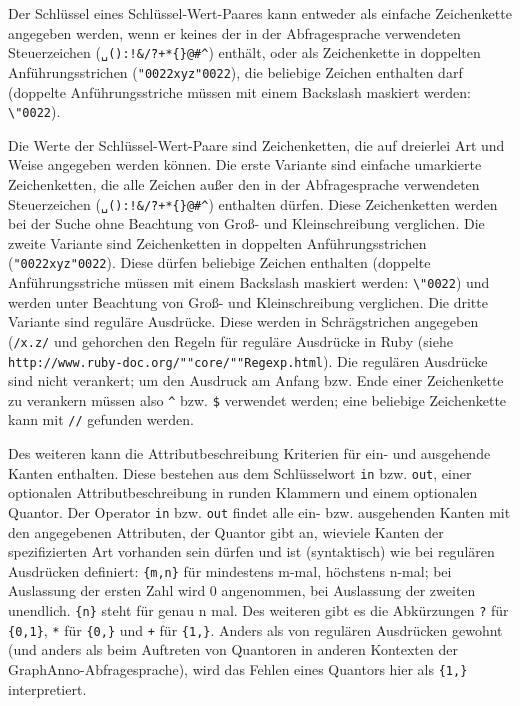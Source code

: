 \documentclass[12pt]{scrartcl}
\begin{document}
Der Schlüssel eines Schlüssel-Wert-Paares kann entweder als einfache Zeichenkette angegeben werden, wenn er keines der in der Abfragesprache verwendeten Steuerzeichen (\texttt{␣():!\&\"/?+*\{\}@\#\^{}}) enthält, oder als Zeichenkette in doppelten Anführungsstrichen (\texttt{\char"0022xyz\char"0022}), die beliebige Zeichen enthalten darf (doppelte Anführungsstriche müssen mit einem Backslash maskiert werden: \texttt{\textbackslash\char"0022}).

Die Werte der Schlüssel-Wert-Paare sind Zeichenketten, die auf dreierlei Art und Weise angegeben werden können. Die erste Variante sind einfache umarkierte Zeichenketten, die alle Zeichen außer den in der Abfragesprache verwendeten Steuerzeichen (\texttt{␣():!\&\"/?+*\{\}@\#\^{}}) enthalten dürfen. Diese Zeichenketten werden bei der Suche ohne Beachtung von Groß- und Kleinschreibung verglichen.
Die zweite Variante sind Zeichenketten in doppelten Anführungsstrichen (\texttt{\char"0022xyz\char"0022}). Diese dürfen beliebige Zeichen enthalten (doppelte Anführungsstriche müssen mit einem Backslash maskiert werden: \texttt{\textbackslash\char"0022}) und werden unter Beachtung von Groß- und Kleinschreibung verglichen. 
Die dritte Variante sind reguläre Ausdrücke. Diese werden in Schrägstrichen angegeben (\texttt{/x.z/} und gehorchen den Regeln für reguläre Ausdrücke in Ruby (siehe \texttt{http://www.ruby-doc.org/""core/""Regexp.html}). Die regulären Ausdrücke sind nicht verankert; um den Ausdruck am Anfang bzw. Ende einer Zeichenkette zu verankern müssen also \texttt{\^} bzw. \texttt{\$} verwendet werden; eine beliebige Zeichenkette kann mit \texttt{//} gefunden werden.

Des weiteren kann die Attributbeschreibung Kriterien für ein- und ausgehende Kanten enthalten. Diese bestehen aus dem Schlüsselwort \texttt{in} bzw. \texttt{out}, einer optionalen Attributbeschreibung in runden Klammern und einem optionalen Quantor. Der Operator \texttt{in} bzw. \texttt{out} findet alle ein- bzw. ausgehenden Kanten mit den angegebenen Attributen, der Quantor gibt an, wieviele Kanten der spezifizierten Art vorhanden sein dürfen und ist (syntaktisch) wie bei regulären Ausdrücken definiert: \texttt{\{m,n\}} für mindestens m-mal, höchstens n-mal; bei Auslassung der ersten Zahl wird 0 angenommen, bei Auslassung der zweiten unendlich. \texttt{\{n\}} steht für genau n mal. Des weiteren gibt es die Abkürzungen \texttt{?} für \texttt{\{0,1\}}, \texttt{*} für \texttt{\{0,\}} und \texttt{+} für \texttt{\{1,\}}.
Anders als von regulären Ausdrücken gewohnt (und anders als beim Auftreten von Quantoren in anderen Kontexten der GraphAnno-Abfragesprache), wird das Fehlen eines Quantors hier als \texttt{\{1,\}} interpretiert.
\end{document}
